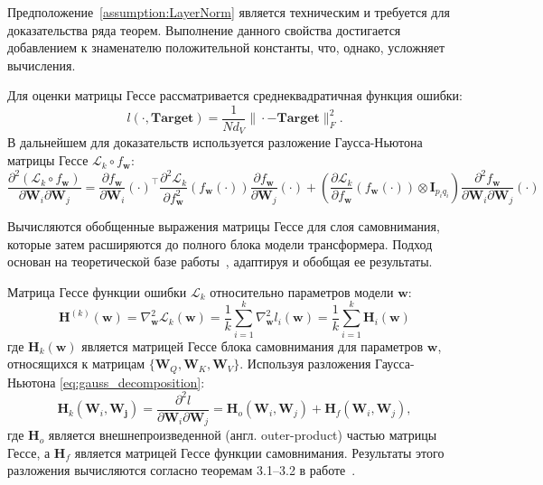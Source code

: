 Предположение~\ref{assumption:LayerNorm} является техническим и требуется для доказательства ряда теорем. Выполнение данного свойства достигается добавлением к знаменателю положительной константы, что, однако, усложняет вычисления.

Для оценки матрицы Гессе рассматривается среднеквадратичная функция ошибки:
\[
    l(\cdot, \textbf{Target}) = \frac{1}{N d_V} \|\cdot - \textbf{Target}\|_F^2.
\]
В дальнейшем для доказательств используется разложение Гаусса-Ньютона матрицы Гессе $\mathcal{L}_k \circ f_{\mathbf{w}}$:
\begin{equation}\label{eq:gauss_decomposition}
    \frac{\partial^2 (\mathcal{L}_k \circ f_{\mathbf{w}})}{\partial \mathbf{W}_i \partial \mathbf{W}_j} = \frac{\partial f_{\mathbf{w}}}{\partial \mathbf{W}_i} (\cdot)^\top \frac{\partial^2 \mathcal{L}_k}{\partial f_{\mathbf{w}}^2} (f_{\mathbf{w}}(\cdot)) \frac{\partial f_{\mathbf{w}}}{\partial \mathbf{W}_j}(\cdot) + \left( \frac{\partial \mathcal{L}_k}{\partial f_{\mathbf{w}}} (f_{\mathbf{w}}(\cdot)) \otimes \mathbf{I}_{p_i q_i} \right) \frac{\partial^2 f_{\mathbf{w}}}{\partial \mathbf{W}_i \partial \mathbf{W}_j}(\cdot)
\end{equation}

Вычисляются обобщенные выражения матрицы Гессе для слоя самовнимания, которые затем расширяются до полного блока модели трансформера. Подход основан на теоретической базе работы~\cite{ormaniec2024attentionhessian}, адаптируя и обобщая ее результаты.

Матрица Гессе функции ошибки $\mathcal{L}_k$ относительно параметров модели $\mathbf{w}$:
\[
    \mathbf{H}^{(k)}(\mathbf{w}) = \nabla^2_{\mathbf{w}} \mathcal{L}_k(\mathbf{w}) = \frac{1}{k} \sum_{i=1}^k \nabla^2_{\mathbf{w}} l_i(\mathbf{w}) = \frac{1}{k} \sum_{i=1}^k \mathbf{H}_i(\mathbf{w})
\]
где $\mathbf{H}_k(\mathbf{w})$ является матрицей Гессе блока самовнимания для параметров $\mathbf{w}$, относящихся к матрицам $\{ \mathbf{W}_Q, \mathbf{W}_K, \mathbf{W}_V\}$. Используя разложения Гаусса-Ньютона \eqref{eq:gauss_decomposition}:
\[
    \mathbf{H}_k(\mathbf{W}_i, \mathbf{W_j}) = \frac{\partial^2 l}{\partial \mathbf{W}_i \partial \mathbf{W}_j} = \mathbf{H}_o(\mathbf{W}_i, \mathbf{W}_j) + \mathbf{H}_f(\mathbf{W}_i, \mathbf{W}_j),
\]
где $\mathbf{H}_o$ является внешнепроизведенной (англ. outer-product) частью матрицы Гессе, а $\mathbf{H}_f$ является матрицей Гессе функции самовнимания.
Результаты этого разложения вычисляются согласно теоремам 3.1--3.2 в работе~\cite{ormaniec2024attentionhessian}.

